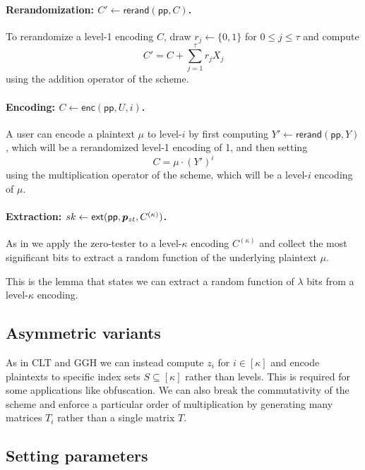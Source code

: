 \paragraph{Rerandomization: $C' \leftarrow \mathsf{rerand}(\mathsf{pp}, C)$.}  To rerandomize a level-1 encoding $C$, draw $r_j \leftarrow \{0,1\}$ for $0 \leq j \leq \tau$ and compute $$C' = C + \sum_{j=1}^\tau r_jX_j$$ using the addition operator of the scheme.

\paragraph{Encoding:  $C \leftarrow \mathsf{enc}(\mathsf{pp},U,i)$.}  A user can encode a plaintext $\mu$ to level-$i$ by first computing $Y' \leftarrow \mathsf{rerand}(\mathsf{pp}, Y)$, which will be a rerandomized level-1 encoding of 1, and then setting $$C = \mu \cdot \left(Y'\right)^i$$ using the multiplication operator of the scheme, which will be a level-$i$ encoding of $\mu$.

\paragraph{Extraction: $sk \leftarrow \mathsf{ext}(\mathsf{pp}, \bm{p}_{zt}, C^{(\kappa)})$.}  As in \cite{ggh13a, clt15} we apply the zero-tester to a level-$\kappa$ encoding $C^{(\kappa)}$ and collect the most significant bits to extract a random function of the underlying plaintext $\mu$.

\begin{lemma}
\label{extraction}
This is the lemma that states we can extract a random function of $\lambda$ bits from a level-$\kappa$ encoding.
\end{lemma}





\subsection{Asymmetric variants}

As in CLT and GGH we can instead compute $z_i$ for $i \in [\kappa]$ and encode plaintexts to specific index sets $S \subseteq [\kappa]$ rather than levels.  This is required for some applications like obfuscation.  We can also break the commutativity of the scheme and enforce a particular order of multiplication by generating many matrices $T_i$ rather than a single matrix $T$.

\subsection{Setting parameters}


